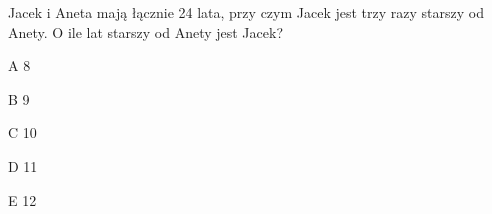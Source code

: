 \begin{tresc}
Jacek i Aneta mają łącznie 24 lata, przy czym Jacek jest trzy razy starszy od Anety. O ile lat starszy od Anety jest Jacek?
\end{tresc}
\begin{wariant}{A} 8 \end{wariant}
\begin{wariant}{B} 9 \end{wariant}
\begin{wariant}{C} 10 \end{wariant}
\begin{wariant}{D} 11 \end{wariant}
\begin{wariant}{E} 12 \end{wariant}
